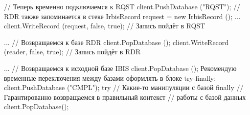 // Теперь временно подключаемся к RQST
client.PushDatabase ("RQST"); // RDR также запоминается в стеке
IrbisRecord request = new IrbisRecord ();
...
client.WriteRecord (request, false, true); // Запись пойдёт в RQST

...
// Возвращаемся к базе RDR
client.PopDatabase ();
client.WriteRecord (reader, false, true); // Запись пойдёт в RDR

...
// Возвращаемся к исходной базе IBIS
client.PopDatabase ();
Рекомендую временные переключения между базами оформлять в блоке try-finally: 
client.PushDatabase ("CMPL");
try
{
   // Какие-то манипуляции с базой
}
finally
{
  // Гарантированно возвращаемся в правильный контекст
  // работы с базой данных
  client.PopDatabase();
}